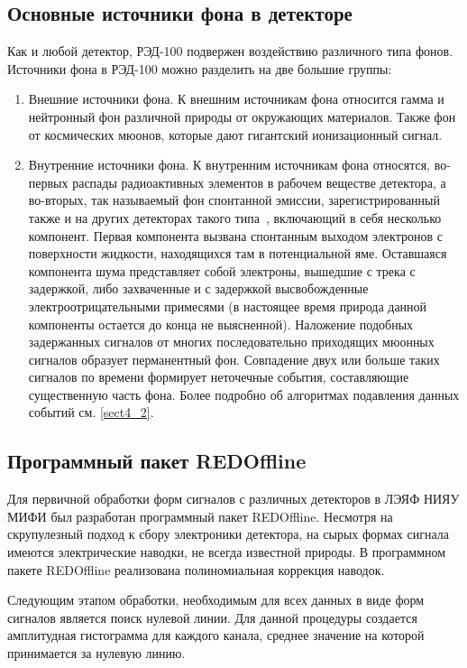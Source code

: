 \subsection{Основные источники фона в детекторе}
\label{subsect2_1_5}
Как и любой детектор, РЭД-100 подвержен воздействию различного типа фонов. Источники фона в РЭД-100 можно разделить на две большие группы:
\begin{enumerate}
    \item Внешние источники фона. К внешним источникам фона относится гамма и нейтронный фон различной природы от окружающих материалов. Также фон от космических мюонов, которые дают гигантский ионизационный сигнал. 
    \item Внутренние источники фона. К внутренним источникам фона относятся, во-первых распады радиоактивных элементов в рабочем веществе детектора, а во-вторых, так называемый фон спонтанной эмиссии, зарегистрированный также и на других детекторах такого типа~\cite{se_akimov, Santos:2011ju}, включающий в себя несколько компонент. Первая компонента вызвана спонтанным выходом электронов с поверхности жидкости, находящихся там в потенциальной яме. Оставшаяся компонента шума представляет собой электроны, вышедшие с трека с задержкой, либо захваченные и с задержкой высвобожденные электроотрицательными примесями (в настоящее время природа данной компоненты остается до конца не выясненной). Наложение подобных задержанных сигналов от многих последовательно приходящих мюонных сигналов образует перманентный фон. Совпадение двух или больше таких сигналов по времени формирует неточечные события, составляющие существенную часть фона. Более подробно об алгоритмах подавления данных событий см. \ref{sect4_2}.
\end{enumerate}

\subsection{Программный пакет REDOffline}
\label{subsect2_1_6}
Для первичной обработки форм сигналов с различных детекторов в ЛЭЯФ НИЯУ МИФИ был разработан программный пакет REDOffline. Несмотря на скрупулезный подход к сбору электроники детектора, на сырых формах сигнала имеются электрические наводки, не всегда известной природы. В программном пакете REDOffline реализована полиномиальная коррекция наводок. 

Следующим этапом обработки, необходимым для всех данных в виде форм сигналов является поиск нулевой линии. Для данной процедуры создается амплитудная гистограмма для каждого канала, среднее значение на которой принимается за нулевую линию.

